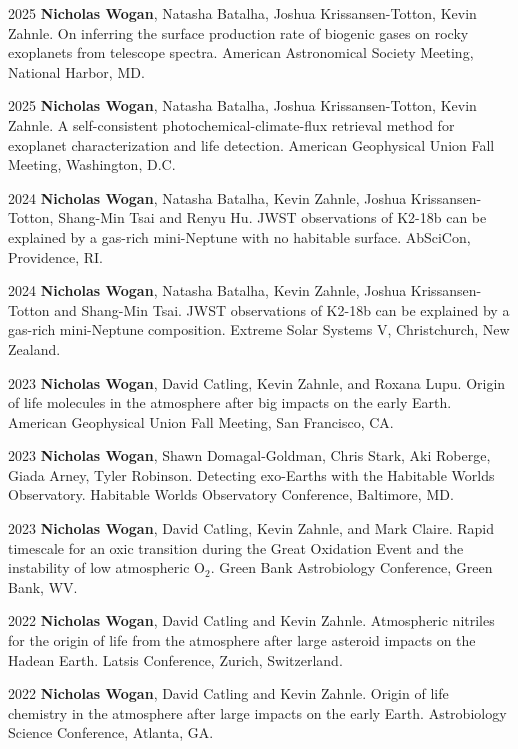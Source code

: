 \documentclass[12pt]{article}
\begin{document}
\begin{cvlist}

\item[2025]
  \textbf{Nicholas Wogan}, Natasha Batalha, Joshua Krissansen-Totton, Kevin Zahnle. On inferring the surface production rate of biogenic gases on rocky exoplanets from telescope spectra. American Astronomical Society Meeting, National Harbor, MD.
\item[2025]
  \textbf{Nicholas Wogan}, Natasha Batalha, Joshua Krissansen-Totton, Kevin Zahnle. A self-consistent photochemical-climate-flux retrieval method for exoplanet characterization and life detection. American Geophysical Union Fall Meeting, Washington, D.C.
\item[2024]
  \textbf{Nicholas Wogan}, Natasha Batalha, Kevin Zahnle, Joshua Krissansen-Totton, Shang-Min Tsai and Renyu Hu. JWST observations of K2-18b can be explained by a gas-rich mini-Neptune with no habitable surface. AbSciCon, Providence, RI.
\item[2024]
  \textbf{Nicholas Wogan}, Natasha Batalha, Kevin Zahnle, Joshua Krissansen-Totton and Shang-Min Tsai. JWST observations of K2-18b can be explained by a gas-rich mini-Neptune composition. Extreme Solar Systems V, Christchurch, New Zealand.
\item[2023]
  \textbf{Nicholas Wogan}, David Catling, Kevin Zahnle, and Roxana Lupu. Origin of life molecules in the atmosphere after big impacts on the early Earth. American Geophysical Union Fall Meeting, San Francisco, CA.
\item[2023]
  \textbf{Nicholas Wogan}, Shawn Domagal-Goldman, Chris Stark, Aki Roberge, Giada Arney, Tyler Robinson. Detecting exo-Earths with the Habitable Worlds Observatory. Habitable Worlds Observatory Conference, Baltimore, MD.
\item[2023]
  \textbf{Nicholas Wogan}, David Catling, Kevin Zahnle, and Mark Claire. Rapid timescale for an oxic transition during the Great Oxidation Event and the instability of low atmospheric O$_2$. Green Bank Astrobiology Conference, Green Bank, WV.
\item[2022]
  \textbf{Nicholas Wogan}, David Catling and Kevin Zahnle. Atmospheric nitriles for the origin of life from the atmosphere after large asteroid impacts on the Hadean Earth. Latsis Conference, Zurich, Switzerland.
\item[2022]
  \textbf{Nicholas Wogan}, David Catling and Kevin Zahnle. Origin of life chemistry in the atmosphere after large impacts on the early Earth. Astrobiology Science Conference, Atlanta, GA.

\end{cvlist}
\end{document}
